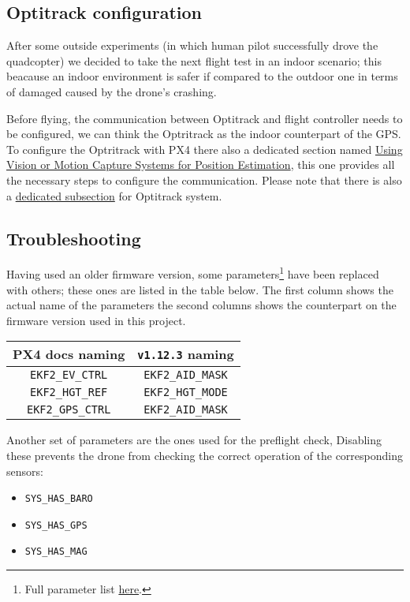 
\subsection{Optitrack configuration}
After some outside experiments (in which human pilot successfully drove the quadcopter) we decided to take the next flight test in an indoor scenario; this beacause an indoor environment is safer if compared to the outdoor one in terms of damaged caused by the drone's crashing.

Before flying, the communication between Optitrack and flight controller needs to be configured, we can think the Optritrack as the indoor counterpart of the GPS. To configure the Optritrack with PX4 there also a dedicated section named \href{https://docs.px4.io/main/en/ros/external_position_estimation.html}{Using Vision or Motion Capture Systems for Position Estimation}, this one provides all the necessary steps to configure the communication. Please note that there is also a \href{https://docs.px4.io/main/en/ros/external_position_estimation.html#specific-system-setups}{dedicated subsection} for Optitrack system.

\subsection*{Troubleshooting}
\begin{description}[style=nextline]
	\item[Parameters] Having used an older firmware version, some parameters\footnote{Full parameter list \href{https://docs.px4.io/main/en/advanced_config/parameter_reference.html}{here}.} have been replaced with others; these ones are listed in the table below. The first column shows the actual name of the parameters the second columns shows the counterpart on the firmware version used in this project.
	\begin{center} 
	\begin{tabular}{|c|c|}
		\hline
		PX4 docs naming & \texttt{v1.12.3} naming \\
		\hline
		\texttt{EKF2\_EV\_CTRL}  &  \texttt{EKF2\_AID\_MASK}  \\
		\hline
		\texttt{EKF2\_HGT\_REF}  &  \texttt{EKF2\_HGT\_MODE}   \\
		\hline
		\texttt{EKF2\_GPS\_CTRL} & \texttt{EKF2\_AID\_MASK}  \\
		\hline
	\end{tabular}
\end{center}
	Another set of parameters are the ones used for the preflight check, Disabling these prevents the drone from checking the correct operation of the corresponding sensors:
	\begin{itemize}
		\item \texttt{SYS\_HAS\_BARO}
		\item \texttt{SYS\_HAS\_GPS}
		\item \texttt{SYS\_HAS\_MAG}
		\end{itemize}
	
	 

\end{description}
